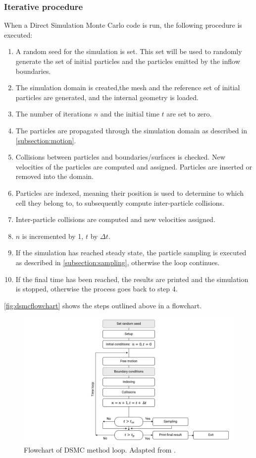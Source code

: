 \subsubsection{Iterative procedure}
When a Direct Simulation Monte Carlo code is run, the following procedure is executed:
\begin{enumerate}
    \item A random seed for the simulation is set. This set will be used to randomly generate the set of initial particles and the particles emitted by the inflow boundaries.
    \item The simulation domain is created,the mesh and the reference set of initial particles are generated, and the internal geometry is loaded.
    \item The number of iterations $n$ and the initial time $t$ are set to zero.
    \item The particles are propagated through the simulation domain as described in \autoref{subsection:motion}.
    \item Collisions between particles and boundaries/surfaces is checked. New velocities of the particles are computed and assigned. Particles are inserted or removed into the domain.
    \item Particles are indexed, meaning their position is used to determine to which cell they belong to, to subsequently compute inter-particle collisions.
    \item Inter-particle collisions are computed and new velocities assigned.
    \item $n$ is incremented by 1, $t$ by $\Delta t$.
    \item If the simulation has reached steady state, the particle sampling is executed as described in \autoref{subsection:sampling}, otherwise the loop continues.
    \item If the final time has been reached, the results are printed and the simulation is stopped, otherwise the process goes back to step 4.
\end{enumerate}

\autoref{fig:dsmcflowchart} shows the steps outlined above in a flowchart.

\begin{figure}[ht]
    \centering
    \includegraphics[width=\textwidth]{../Images/3. Methodology/dsmcflowchart.pdf}
    \caption{Flowchart of DSMC method loop. Adapted from \cite{dsmcnotes}.}
    \label{fig:dsmcflowchart}
\end{figure}

